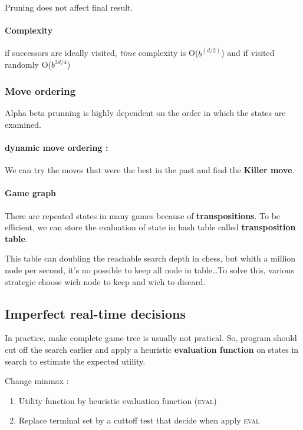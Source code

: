 Pruning does not affect final result.

\paragraph{Complexity} if successors are ideally visited, \textit{time} complexity
is O($b^{(d/2)}$) and if visited randomly O($b^{3d/4}$)


\subsubsection{Move ordering}

Alpha beta prunning is highly dependent on the order in which the states are examined.

\paragraph{dynamic move ordering :} We can try the moves that were the best in the past and find the \textbf{Killer move}.

\paragraph{Game graph} There are repeated states in many games because of \textbf{transpositions}.
To be efficient, we can store the evaluation of state in hash table called \textbf{transposition
table}.

This table can doubling the reachable search depth in chess, but whith a million node per second,
it's no possible to keep all node in table\ldots To solve this, various strategie
choose wich node to keep and wich to discard.

\subsection{Imperfect real-time decisions}
In practice, make complete game tree is usually not pratical.
So, program should cut off the search earlier and apply a heuristic \textbf{evaluation
function} on states in search to estimate the expected utility.

Change minmax :
\begin{enumerate}
    \item Utility function by heuristic evaluation function (\textsc{eval})
    \item Replace terminal set by a cuttoff test that decide when apply \textsc{eval}
\end{enumerate}

